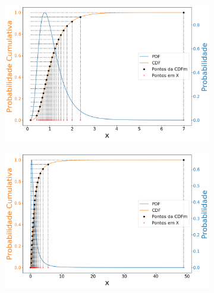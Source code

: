 \begin{figure}[H]
	\begin{subfigure}[b]{0.49\textwidth}
		\centering 
		\includegraphics[width=\textwidth]{./figuras/CDFm_lognormal_05}
		\caption{}
		\label{fig:log050}
	\end{subfigure}
	\hfill
	\begin{subfigure}[b]{0.49\textwidth}
		\centering 
		\includegraphics[width=\textwidth]{./figuras/CDFm_lognormal_1}
		\caption{}
		\label{fig:log100}
	\end{subfigure}
	

\end{figure}
